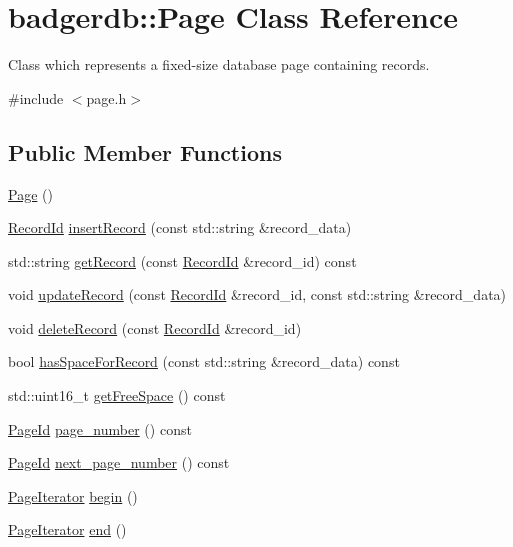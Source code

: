 \hypertarget{classbadgerdb_1_1Page}{\section{badgerdb\-:\-:Page Class Reference}
\label{classbadgerdb_1_1Page}
}


Class which represents a fixed-\/size database page containing records.  




{\ttfamily \#include $<$page.\-h$>$}

\subsection*{Public Member Functions}
\begin{DoxyCompactItemize}
\item 
\hyperlink{classbadgerdb_1_1Page_a1e4a3930a92ed6e71ffd253cf224379a}{Page} ()
\item 
\hyperlink{structbadgerdb_1_1RecordId}{Record\-Id} \hyperlink{classbadgerdb_1_1Page_ad0b1e85fe7849fb767dd8c21a8053cf4}{insert\-Record} (const std\-::string \&record\-\_\-data)
\item 
std\-::string \hyperlink{classbadgerdb_1_1Page_a77b352920c3e66384317bbcdcd900d99}{get\-Record} (const \hyperlink{structbadgerdb_1_1RecordId}{Record\-Id} \&record\-\_\-id) const 
\item 
void \hyperlink{classbadgerdb_1_1Page_ae24e3f6076d6c0a18d4dd2014d540bab}{update\-Record} (const \hyperlink{structbadgerdb_1_1RecordId}{Record\-Id} \&record\-\_\-id, const std\-::string \&record\-\_\-data)
\item 
void \hyperlink{classbadgerdb_1_1Page_a1bc17754b4ed548f8520a6274b3a4202}{delete\-Record} (const \hyperlink{structbadgerdb_1_1RecordId}{Record\-Id} \&record\-\_\-id)
\item 
bool \hyperlink{classbadgerdb_1_1Page_a35bf91df5caa67a606681519740848b0}{has\-Space\-For\-Record} (const std\-::string \&record\-\_\-data) const 
\item 
std\-::uint16\-\_\-t \hyperlink{classbadgerdb_1_1Page_af3d324b5aae656030465e213e86e2070}{get\-Free\-Space} () const 
\item 
\hyperlink{namespacebadgerdb_a1f49e404293bf4240756b89b53b1587a}{Page\-Id} \hyperlink{classbadgerdb_1_1Page_af55a0b44876bff4d513bdbed8bc8c5a3}{page\-\_\-number} () const 
\item 
\hyperlink{namespacebadgerdb_a1f49e404293bf4240756b89b53b1587a}{Page\-Id} \hyperlink{classbadgerdb_1_1Page_a8050c219873e6b1d51aec2adbea8a507}{next\-\_\-page\-\_\-number} () const 
\item 
\hyperlink{classbadgerdb_1_1PageIterator}{Page\-Iterator} \hyperlink{classbadgerdb_1_1Page_aa0fdb281074cd60cb1f1d6ea6d620772}{begin} ()
\item 
\hyperlink{classbadgerdb_1_1PageIterator}{Page\-Iterator} \hyperlink{classbadgerdb_1_1Page_a8e78cba69bef682a5427932485da4608}{end} ()
\end{DoxyCompactItemize}
